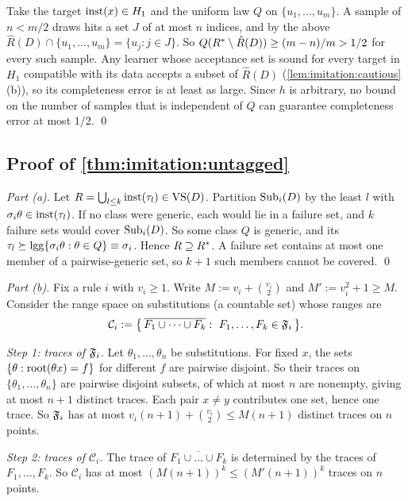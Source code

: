 Take the target $\mathrm{inst}(x)\in H_1$ and the uniform law $Q$ on $\{u_1,\dots,u_m\}$. A sample of $n<m/2$ draws hits a set $J$ of at most $n$ indices, and by the above $\hat R(D)\cap\{u_1,\dots,u_m\}=\{u_j:j\in J\}$. So $Q(R^{*}\setminus\hat R(D))\ge(m-n)/m>1/2$ for every such sample. Any learner whose acceptance set is sound for every target in $H_1$ compatible with its data accepts a subset of $\hat R(D)$ (\cref{lem:imitation:cautious}(b)), so its completeness error is at least as large. Since $h$ is arbitrary, no bound on the number of samples that is independent of $Q$ can guarantee completeness error at most $1/2$. \qed

\subsection{Proof of \texorpdfstring{\cref{thm:imitation:untagged}}{the untagged-union theorem}}\label{app:imitation:untagged}

\emph{Part (a).} Let $R=\bigcup_{l\le k}\mathrm{inst}(\tau_l)\in\mathrm{VS}(D)$. Partition $\mathrm{Sub}_i(D)$ by the least $l$ with $\sigma_i\theta\in\mathrm{inst}(\tau_l)$. If no class were generic, each would lie in a failure set, and $k$ failure sets would cover $\mathrm{Sub}_i(D)$. So some class $Q$ is generic, and its $\tau_l\succeq\mathrm{lgg}\{\sigma_i\theta:\theta\in Q\}\equiv\sigma_i$. Hence $R\supseteq R^{*}$. A failure set contains at most one member of a pairwise-generic set, so $k+1$ such members cannot be covered. \qed

\emph{Part (b).} Fix a rule $i$ with $v_i\ge1$. Write $M:=v_i+\binom{v_i}2$ and $M':=v_i^2+1\ge M$. Consider the range space on substitutions (a countable set) whose ranges are
\[
\mathcal C_i:=\bigl\{\,\overline{F_1\cup\dots\cup F_k}:\ F_1,\dots,F_k\in\Fail_i\,\bigr\}.
\]

\emph{Step 1: traces of $\mathfrak F_i$.} Let $\theta_1,\dots,\theta_n$ be substitutions. For fixed $x$, the sets $\{\theta:\mathrm{root}(\theta x)=f\}$ for different $f$ are pairwise disjoint. So their traces on $\{\theta_1,\dots,\theta_n\}$ are pairwise disjoint subsets, of which at most $n$ are nonempty, giving at most $n+1$ distinct traces. Each pair $x\neq y$ contributes one set, hence one trace. So $\mathfrak F_i$ has at most $v_i(n+1)+\binom{v_i}2\le M(n+1)$ distinct traces on $n$ points.

\emph{Step 2: traces of $\mathcal C_i$.} The trace of $\overline{F_1\cup\dots\cup F_k}$ is determined by the traces of $F_1,\dots,F_k$. So $\mathcal C_i$ has at most $(M(n+1))^k\le(M'(n+1))^k$ traces on $n$ points.

